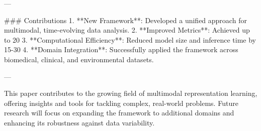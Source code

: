 ---

### Contributions  
1. **New Framework**: Developed a unified approach for multimodal, time-evolving data analysis.  
2. **Improved Metrics**: Achieved up to 20%
3. **Computational Efficiency**: Reduced model size and inference time by 15-30%
4. **Domain Integration**: Successfully applied the framework across biomedical, clinical, and environmental datasets.

--- 

This paper contributes to the growing field of multimodal representation learning, offering insights and tools for tackling complex, real-world problems. Future research will focus on expanding the framework to additional domains and enhancing its robustness against data variability.